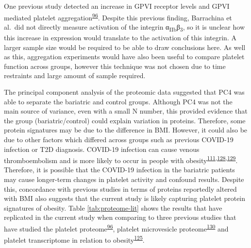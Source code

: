 \documentclass[11pt,twoside]{bristolthesis}
\begin{document}
One previous study detected an increase in GPVI receptor levels and GPVI mediated platelet aggregation\textsuperscript{\protect\hyperlink{ref-Barrachina2019}{96}}. Despite this previous finding, Barrachina et al.~did not directly measure activation of the integrin α\textsubscript{IIb}β\textsubscript{3}, so it is unclear how this increase in expression would translate to the activation of this integrin. A larger sample size would be required to be able to draw conclusions here. As well as this, aggregation experiments would have also been useful to compare platelet function across groups, however this technique was not chosen due to time restraints and large amount of sample required.

The principal component analysis of the proteomic data suggested that PC4 was able to separate the bariatric and control groups. Although PC4 was not the main source of variance, even with a small N number, this provided evidence that the group (bariatric/control) could explain variation in proteins. Therefore, some protein signatures may be due to the difference in BMI. However, it could also be due to other factors which differed across groups such as previous COVID-19 infection or T2D diagnosis. COVID-19 infection can cause venous thromboembolism and is more likely to occur in people with obesity\textsuperscript{\protect\hyperlink{ref-Klok2020}{111},\protect\hyperlink{ref-McFadyen2020}{128},\protect\hyperlink{ref-Wang2021}{129}}. Therefore, it is possible that the COVID-19 infection in the bariatric patients may cause longer-term changes in platelet activity and confound results. Despite this, concordance with previous studies in terms of proteins reportedly altered with BMI also suggests that the current study is likely capturing platelet protein signatures of obesity. Table \ref{tab:proteome-lit} shows the results that have replicated in the current study when comparing to three previous studies that have studied the platelet proteome\textsuperscript{\protect\hyperlink{ref-Barrachina2019}{96}}, platelet microvesicle proteome\textsuperscript{\protect\hyperlink{ref-Grande2019}{130}} and platelet transcriptome in relation to obesity\textsuperscript{\protect\hyperlink{ref-Freedman2010}{125}}.
\end{document}
